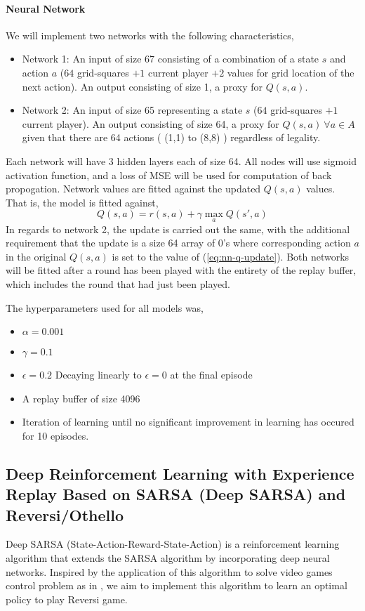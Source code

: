 \documentclass[../report.tex]{subfiles}
\begin{document}
\paragraph{Neural Network}
We will implement two networks with the following characteristics,
\begin{itemize}
    \item Network 1: An input of size 67 consisting of a combination of a state $s$ and action $a$ ($64$ grid-squares $+ 1$ current player $+ 2$ values for grid location of the next action). An output consisting of size 1, a proxy for $Q(s,a)$.
    \item Network 2: An input of size 65 representing a state $s$ ($64$ grid-squares $+ 1$ current player). An output consisting of size 64, a proxy for $Q(s,a)\:\forall a \in A$ given that there are 64 actions ( (1,1) to (8,8) ) regardless of legality.
\end{itemize}
Each network will have 3 hidden layers each of size 64. All nodes will use sigmoid activation function, and a loss of MSE will be used for computation of back propogation. Network values are fitted against the updated $Q(s,a)$ values. That is, the model is fitted against,
\begin{equation} \label{eq:nn-q-update}
    Q(s,a) = r(s,a) + \gamma \max_a Q(s',a)
\end{equation}
In regards to network 2, the update is carried out the same, with the additional requirement that the update is a size 64 array of 0's where corresponding action $a$ in the original $Q(s,a)$ is set to the value of (\ref{eq:nn-q-update}). Both networks will be fitted after a round has been played with the entirety of the replay buffer, which includes the round that had just been played.

The hyperparameters used for all models was,
\begin{itemize}
    \item $\alpha=0.001$
    \item $\gamma=0.1$
    \item $\epsilon=0.2$ Decaying linearly to $\epsilon=0$ at the final episode
    \item A replay buffer of size 4096
    \item Iteration of learning until no significant improvement in learning has occured for 10 episodes.
\end{itemize}

\subsection{Deep Reinforcement Learning with Experience Replay Based on SARSA (Deep SARSA) and Reversi/Othello}
Deep SARSA (State-Action-Reward-State-Action) is a reinforcement learning algorithm that extends the SARSA algorithm by incorporating deep neural networks. Inspired by the application of this algorithm to solve video games control problem as in \cite{7849837}, we aim to implement this algorithm to learn an optimal policy to play Reversi game.
\end{document}
